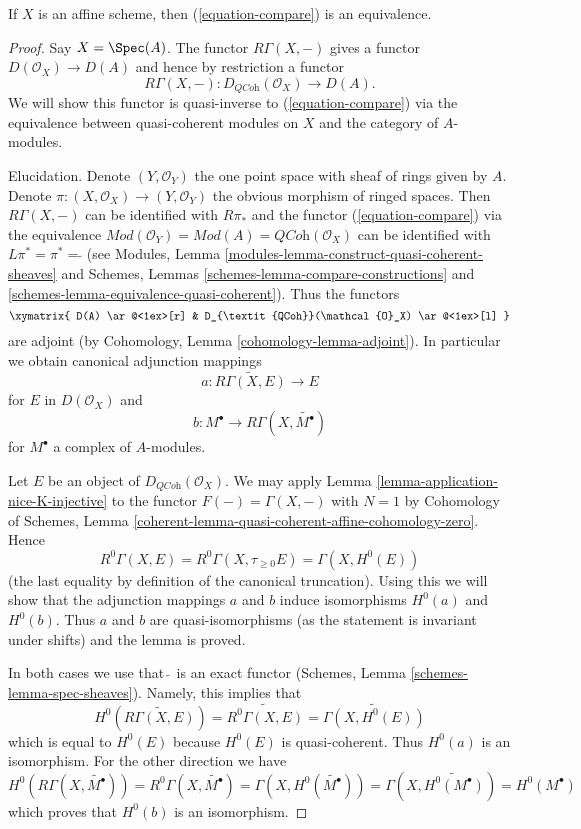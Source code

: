 \begin{lemma}
\label{lemma-affine-compare-bounded}
If $X$ is an affine scheme, then (\ref{equation-compare}) is an equivalence.
\end{lemma}

\begin{proof}
Say $X = \Spec(A)$. The functor $R\Gamma(X, -)$ gives a functor
$D(\mathcal{O}_X) \to D(A)$ and hence by restriction a functor
\begin{equation}
\label{equation-back}
R\Gamma(X, -) : D_{\textit{QCoh}}(\mathcal{O}_X) \longrightarrow D(A).
\end{equation}
We will show this functor is quasi-inverse to (\ref{equation-compare})
via the equivalence between quasi-coherent modules on $X$ and
the category of $A$-modules.

\medskip\noindent
Elucidation. Denote $(Y, \mathcal{O}_Y)$ the one point space with sheaf
of rings given by $A$. Denote
$\pi : (X, \mathcal{O}_X) \to (Y, \mathcal{O}_Y)$
the obvious morphism of ringed spaces.
Then $R\Gamma(X, -)$ can be identified with $R\pi_*$ and the functor
(\ref{equation-compare}) via the equivalence
$\textit{Mod}(\mathcal{O}_Y) = \textit{Mod}(A) = \textit{QCoh}(\mathcal{O}_X)$
can be identified with $L\pi^* = \pi^* = \widetilde{}$ (see
Modules, Lemma \ref{modules-lemma-construct-quasi-coherent-sheaves} and
Schemes, Lemmas \ref{schemes-lemma-compare-constructions} and
\ref{schemes-lemma-equivalence-quasi-coherent}). Thus the functors
$$
\xymatrix{
D(A) \ar@<1ex>[r] & D_{\textit{QCoh}}(\mathcal{O}_X) \ar@<1ex>[l]
}
$$
are adjoint (by Cohomology, Lemma \ref{cohomology-lemma-adjoint}). In
particular we obtain canonical adjunction mappings
$$
a : \widetilde{R\Gamma(X, E)} \longrightarrow E
$$
for $E$ in $D(\mathcal{O}_X)$ and
$$
b : M^\bullet \longrightarrow R\Gamma(X, \widetilde{M^\bullet})
$$
for $M^\bullet$ a complex of $A$-modules.

\medskip\noindent
Let $E$ be an object of $D_{\textit{QCoh}}(\mathcal{O}_X)$. We may apply
Lemma \ref{lemma-application-nice-K-injective}
to the functor $F(-) = \Gamma(X, -)$
with $N = 1$ by Cohomology of Schemes, Lemma
\ref{coherent-lemma-quasi-coherent-affine-cohomology-zero}.
Hence
$$
R^0\Gamma(X, E) = R^0\Gamma(X, \tau_{\geq 0}E) = \Gamma(X, H^0(E))
$$
(the last equality by definition of the canonical truncation).
Using this we will show that the adjunction mappings $a$ and $b$
induce isomorphisms $H^0(a)$ and $H^0(b)$. Thus $a$ and $b$
are quasi-isomorphisms (as the statement is invariant under shifts)
and the lemma is proved.

\medskip\noindent
In both cases we use that $\widetilde{\ }$ is an exact functor
(Schemes, Lemma \ref{schemes-lemma-spec-sheaves}). Namely, this
implies that
$$
H^0\left(\widetilde{R\Gamma(X, E)}\right) = \widetilde{R^0\Gamma(X, E)}
= \widetilde{\Gamma(X, H^0(E))}
$$
which is equal to $H^0(E)$ because $H^0(E)$ is quasi-coherent. Thus
$H^0(a)$ is an isomorphism. For the other direction we have
$$
H^0(R\Gamma(X, \widetilde{M^\bullet})) =
R^0\Gamma(X, \widetilde{M^\bullet}) =
\Gamma(X, H^0(\widetilde{M^\bullet})) =
\Gamma(X, \widetilde{H^0(M^\bullet)}) = H^0(M^\bullet)
$$
which proves that $H^0(b)$ is an isomorphism.
\end{proof}


